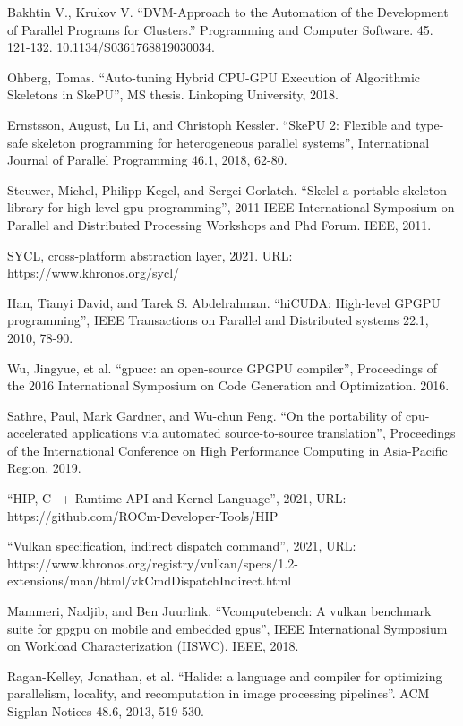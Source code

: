 \documentclass[11pt,fleqn,english,russian]{report} %
\begin{document}
\begin{thebibliography}{10}
	 Bakhtin V., Krukov V. ``DVM-Approach to the Automation of the Development of Parallel Programs for Clusters.'' Programming and Computer Software. 45. 121-132. 10.1134/S0361768819030034. 
	
	 Ohberg, Tomas. ``Auto-tuning Hybrid CPU-GPU Execution of Algorithmic Skeletons in SkePU'', MS thesis. Linkoping University, 2018.	
	
	 Ernstsson, August, Lu Li, and Christoph Kessler. ``SkePU 2: Flexible and type-safe skeleton programming for heterogeneous parallel systems'', International Journal of Parallel Programming 46.1, 2018, 62-80. 
	
	 Steuwer, Michel, Philipp Kegel, and Sergei Gorlatch. ``Skelcl-a portable skeleton library for high-level gpu programming'', 2011 IEEE International Symposium on Parallel and Distributed Processing Workshops and Phd Forum. IEEE, 2011. 
	
	 SYCL, cross-platform abstraction layer, 2021. URL: https://www.khronos.org/sycl/	
	
	
	 Han, Tianyi David, and Tarek S. Abdelrahman. ``hiCUDA: High-level GPGPU programming'', IEEE Transactions on Parallel and Distributed systems 22.1, 2010, 78-90. 	
	
	 Wu, Jingyue, et al. ``gpucc: an open-source GPGPU compiler'', Proceedings of the 2016 International Symposium on Code Generation and Optimization. 2016. 	
	
	 Sathre, Paul, Mark Gardner, and Wu-chun Feng. ``On the portability of cpu-accelerated applications via automated source-to-source translation'', Proceedings of the International Conference on High Performance Computing in Asia-Pacific Region. 2019.
	
	 ``HIP, C++ Runtime API and Kernel Language'', 2021, URL: https://github.com/ROCm-Developer-Tools/HIP	
	
	 ``Vulkan specification, indirect dispatch command'', 2021, URL: https://www.khronos.org/registry/vulkan/specs/1.2-extensions/man/html/vkCmdDispatchIndirect.html
	
	 Mammeri, Nadjib, and Ben Juurlink. ``Vcomputebench: A vulkan benchmark suite for gpgpu on mobile and embedded gpus'', IEEE International Symposium on Workload Characterization (IISWC). IEEE, 2018. 
	
	 Ragan-Kelley, Jonathan, et al. ``Halide: a language and compiler for optimizing parallelism, locality, and recomputation in image processing pipelines''. ACM Sigplan Notices 48.6, 2013, 519-530. 
	

\end{thebibliography}
\end{document}
